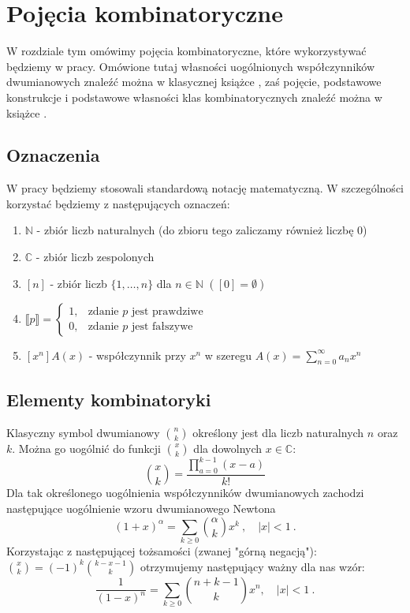 
\chapter{Pojęcia kombinatoryczne}

W rozdziale tym omówimy pojęcia kombinatoryczne, które wykorzystywać będziemy w pracy. Omówione tutaj własności uogólnionych współczynników dwumianowych znaleźć można w klasycznej książce \cite{knuth1989concrete}, zaś pojęcie, podstawowe konstrukcje i podstawowe własności klas kombinatorycznych znaleźć można w książce \cite{Flajolet_08}.

\section{Oznaczenia}
W pracy będziemy stosowali standardową notację matematyczną. W szczególności korzystać będziemy z następujących oznaczeń:
\begin{enumerate}
    \item $\mathbb{N}$ - zbiór liczb naturalnych (do zbioru tego zaliczamy również liczbę $0$)
    \item $\mathbb{C}$ - zbiór liczb zespolonych 
    \item $[n]$ - zbiór liczb $\{1,\dotsc,n\}$ dla $n \in \mathbb{N}$ $([0] = \emptyset)$
    \item $\llbracket p \rrbracket = \left\{
        \begin{array}{rl}
            1, & \text{zdanie $p$ jest prawdziwe}\\
            0, & \text{zdanie $p$ jest fałszywe}
        \end{array}
        \right.$
    \item $[x^n]A(x)$ - współczynnik przy $x^n$ w szeregu $A(x) = \sum\limits_{n=0}^{\infty} a_n x^n$
\end{enumerate}

\section{Elementy kombinatoryki}

Klasyczny symbol dwumianowy $\binom{n}{k}$ określony jest dla liczb naturalnych $n$ oraz $k$. Można go uogólnić do funkcji $\binom{x}{k}$ dla dowolnych $x \in \mathbb{C}$:
$$
\binom{x}{k} =  \frac{\prod_{a=0}^{k-1}(x-a)}{k!}
$$
Dla tak określonego uogólnienia współczynników dwumianowych zachodzi następujące uogólnienie wzoru dwumianowego Newtona
$$
(1+x)^{\alpha} = \sum_{k\geq 0} \binom{\alpha}{k} x^k~,\quad |x|<1~.
$$ 
Korzystając z następującej tożsamości (zwanej "górną negacją"): 
$\binom{x}{k} = (-1)^k \binom{k-x-1}{k}$ otrzymujemy następujący ważny dla nas wzór:
\begin{equation}\label{eq:genBinomial}
\frac{1}{(1-x)^n} = \sum_{k\geq 0} \binom{n+k-1}{k} x^n, \quad |x|<1~.
\end{equation}

